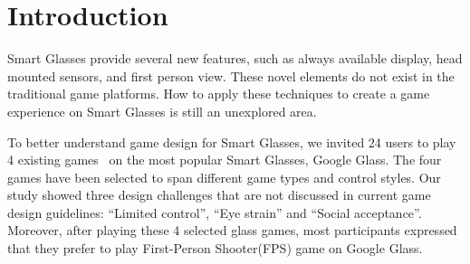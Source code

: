 \documentclass{acm_proc_article-sp}
\begin{document}


\section{Introduction}

Smart Glasses provide several new features, such as always available display, head mounted sensors, and first person view. These novel elements do not exist in the traditional game platforms. How to apply these techniques to create a  game experience on Smart Glasses is still an unexplored area.

To better understand game design for Smart Glasses, we invited 24 users to play 4 existing games~\cite{minigame} on the most popular Smart Glasses, Google Glass. The four games have been selected to span different game types and control styles. Our study showed three design challenges that are not discussed in current game design guidelines: ``Limited control'', ``Eye strain'' and ``Social acceptance''. Moreover, after playing these 4 selected glass games, most participants expressed that they prefer to play First-Person Shooter(FPS) game on Google Glass. 

\end{document}
